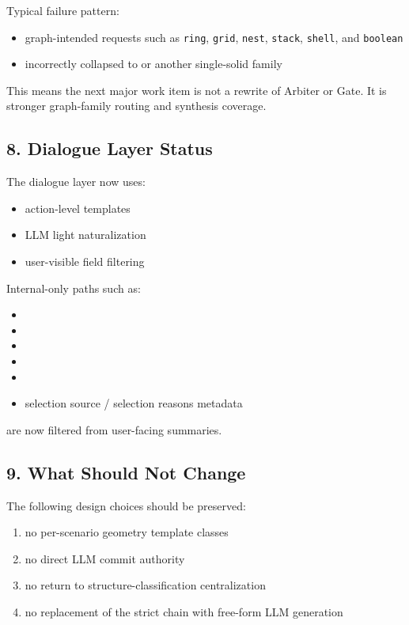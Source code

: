 \documentclass[11pt,a4paper]{ctexart}
\begin{document}
Typical failure pattern:

\begin{itemize}
\item graph-intended requests such as \texttt{ring}, \texttt{grid}, \texttt{nest}, \texttt{stack}, \texttt{shell}, and \texttt{boolean}
\item incorrectly collapsed to  or another single-solid family
\end{itemize}

This means the next major work item is not a rewrite of Arbiter or Gate. It is stronger graph-family routing and synthesis coverage.

\subsection*{8. Dialogue Layer Status}

The dialogue layer now uses:

\begin{itemize}
\item action-level templates
\item LLM light naturalization
\item user-visible field filtering
\end{itemize}

Internal-only paths such as:

\begin{itemize}
\item {}
\item {}
\item {}
\item {}
\item {}
\item selection source / selection reasons metadata
\end{itemize}

are now filtered from user-facing summaries.

\subsection*{9. What Should Not Change}

The following design choices should be preserved:

\begin{enumerate}
\item no per-scenario geometry template classes
\item no direct LLM commit authority
\item no return to structure-classification centralization
\item no replacement of the strict chain with free-form LLM generation
\end{enumerate}
\end{document}
